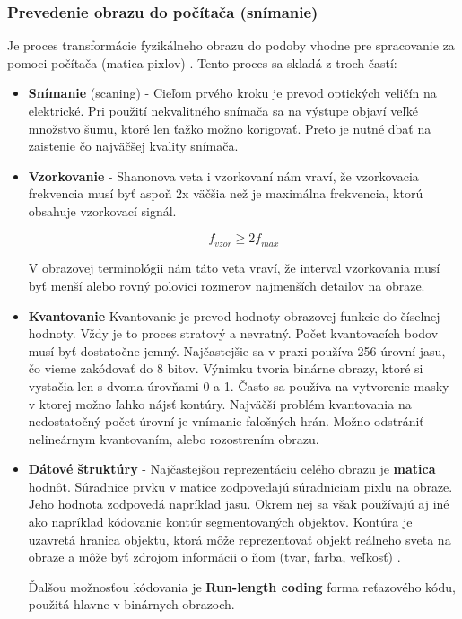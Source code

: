 \subsubsection{Prevedenie obrazu do počítača (snímanie)}
Je proces transformácie fyzikálneho obrazu do podoby vhodne pre spracovanie za pomoci počítača (matica pixlov) \cite{Analysis_and_Machine_Vision}. Tento proces sa skladá z troch častí: 
\begin{itemize}
\item \textbf{Snímanie} (scaning) - Cieľom prvého kroku je prevod optických veličín na elektrické. Pri použití nekvalitného snímača sa na výstupe objaví veľké množstvo šumu, ktoré len ťažko možno korigovať. Preto je nutné dbať na zaistenie čo najväčšej kvality snímača. 

\item \textbf{Vzorkovanie} - Shanonova veta i vzorkovaní nám vraví, že vzorkovacia frekvencia musí byť aspoň 2x väčšia než je maximálna frekvencia, ktorú obsahuje vzorkovací signál.

$$\textit{f}_{\textit{vzor}} \ge {2} \textit{f}_{\textit{max}}$$

V obrazovej terminológii nám táto veta vraví, že interval vzorkovania musí byť menší alebo rovný polovici rozmerov najmenších detailov na obraze. 

\item \textbf{Kvantovanie} 
Kvantovanie je prevod hodnoty obrazovej funkcie do číselnej hodnoty. Vždy je to proces stratový a nevratný. Počet kvantovacích bodov musí byť dostatočne jemný. Najčastejšie sa v praxi používa 256 úrovní jasu, čo vieme zakódovať do 8 bitov. Výnimku tvoria binárne obrazy, ktoré si vystačia len s dvoma úrovňami 0 a 1. Často sa používa na vytvorenie masky v ktorej možno ľahko nájsť kontúry. Najväčší problém kvantovania na nedostatočný počet úrovní je vnímanie falošných hrán. Možno odstrániť nelineárnym kvantovaním, alebo rozostrením obrazu. 


\item \textbf{Dátové štruktúry} - Najčastejšou reprezentáciu celého obrazu je \textbf{matica} hodnôt. Súradnice prvku v matice zodpovedajú súradniciam pixlu na obraze. Jeho hodnota zodpovedá napríklad jasu.  Okrem nej sa však používajú aj iné ako napríklad kódovanie kontúr segmentovaných objektov. Kontúra je uzavretá hranica objektu, ktorá môže reprezentovať objekt reálneho sveta na obraze a môže byť zdrojom informácii o ňom (tvar, farba, veľkosť) \cite{Analysis_and_Machine_Vision} .

Ďalšou možnosťou kódovania je \textbf{Run-length coding} forma reťazového kódu, použitá hlavne v binárnych obrazoch. 


\end{itemize}
